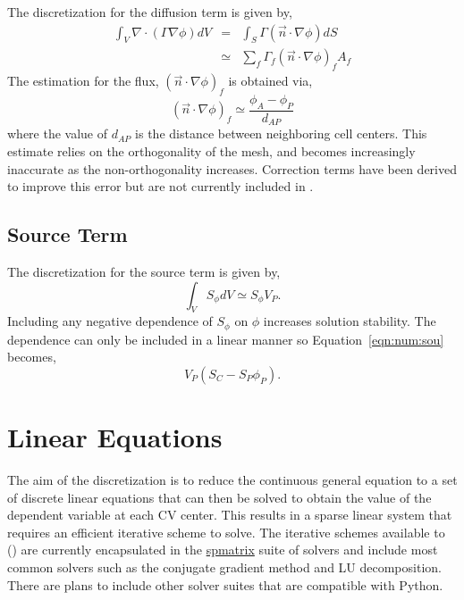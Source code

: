 The discretization for the diffusion term is given by,
\begin{eqnarray}
\int_V \nabla \cdot (\Gamma\nabla\phi) dV & = & \int_S \Gamma (\vec{n} \cdot \nabla\phi) dS \\
& \simeq & \sum_f \Gamma_f (\vec{n} \cdot \nabla\phi)_f A_f
\label{eqn:num:dif}
\end{eqnarray}
The estimation for the flux, $(\vec{n} \cdot \nabla\phi)_f$ is obtained via,
\begin{equation}
(\vec{n} \cdot \nabla\phi)_f \simeq \frac{\phi_A-\phi_P}{d_{AP}}
\end{equation}
where the value of $d_{AP}$ is the distance between neighboring cell
centers.  This estimate relies on the orthogonality of the mesh, and
becomes increasingly inaccurate as the non-orthogonality increases.
Correction terms have been derived to improve this error but are not
currently included in \FiPy{}.

\subsection{Source Term}

The discretization for the source term is given by, 
\begin{equation}
\int_V S_{\phi} dV \simeq S_\phi V_P.
\label{eqn:num:sou}
\end{equation}
Including any negative dependence of $S_\phi$ on $\phi$ increases
solution stability. The dependence can only be included in a linear
manner so Equation~\eqref{eqn:num:sou} becomes,
\begin{equation}
V_P (S_C - S_P \phi_P).
\end{equation}

\section{Linear Equations}

The aim of the discretization is to reduce the continuous general
equation to a set of discrete linear equations that can then be solved
to obtain the value of the dependent variable at each CV center. This
results in a sparse linear system that requires an efficient iterative
scheme to solve. The iterative schemes available to \FiPy() are
currently encapsulated in the \href{#id5}{spmatrix} suite of solvers
and include most common solvers such as the conjugate gradient method
and LU decomposition. There are plans to include other solver suites
that are compatible with Python.

